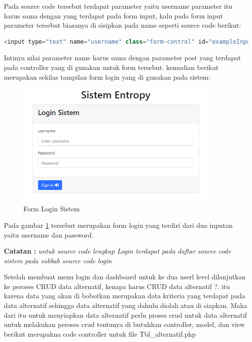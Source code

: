 Pada source code tersebut terdapat parameter yaitu username parameter itu harus sama dengan yang terdapat pada form input, kalu pada form input parameter tersebut biasanya di sisipkan pada name seperti source code berikut:

\begin{lstlisting}[language=PHP]
<input type="text" name="username" class="form-control" id="exampleInputUsername1" placeholder="Enter username">
\end{lstlisting}

Intinya nilai parameter name harus sama dengan parameter post yang terdapat pada controller yang di gunakan untuk form tersebut. kemudian berikut merupakan sekilas tampilan form login yang di gunakan pada sistem:

\begin{figure}[!htbp]
	\centerline{\includegraphics[width=0.90\textwidth]{figures/view/7.png}}
	\caption{Form Login Sistem}
	\label{ve7}
\end{figure}

Pada gambar \ref{ve7} tersebut merupakan form login yang terdiri dari dua inputan yaitu username dan password.

\textbf{Catatan :} 
\textit{untuk source code lengkap Login terdapat pada daftar source code sistem pada subbab source code login}\par


\pagebreak
Setelah membuat menu login dan dashboard untuk ke dua userl level dilanjutkan ke peroses CRUD data alternatif, kenapa harus CRUD data alternatif ?. itu karena data yang akan di bobotkan merupakan data kriteria yang terdapat pada data alternatif sehingga data alternatif yang dahulu diolah atau di siapkan. Maka dari itu untuk menyiapkan data alternatif perlu proses crud untuk data alternatif untuk melakukan peroses crud tentunya di butuhkan controller, model, dan view berikut merupakna code controller untuk file Tbl\_alternatif.php 

